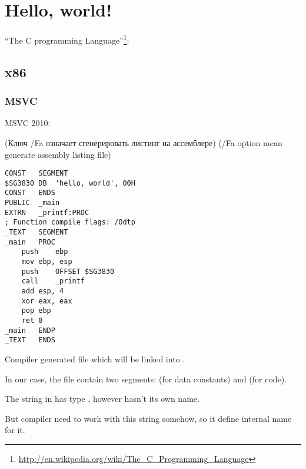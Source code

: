 ﻿\section{Hello, world!}
\label{sec:helloworld}

 ``The C programming Language''\footnote{\url{http://en.wikipedia.org/wiki/The_C_Programming_Language}}:



\subsection{x86}

\subsubsection{MSVC}

 MSVC 2010: 

\IFRU
{(Ключ /Fa означает сгенерировать листинг на ассемблере)}
{(/Fa option mean generate assembly listing file)}

\begin{lstlisting}
CONST	SEGMENT
$SG3830	DB	'hello, world', 00H
CONST	ENDS
PUBLIC	_main
EXTRN	_printf:PROC
; Function compile flags: /Odtp
_TEXT	SEGMENT
_main	PROC
	push	ebp
	mov	ebp, esp
	push	OFFSET $SG3830
	call	_printf
	add	esp, 4
	xor	eax, eax
	pop	ebp
	ret	0
_main	ENDP
_TEXT	ENDS
\end{lstlisting}

{Compiler generated  file which will be linked into .}

{In our case, the file contain two segments:  (for data constants) and  (for code).} 

{The string  in \CCpp has type , however hasn't its own name.}

{But compiler need to work with this string somehow, so it define internal name  for it.}

